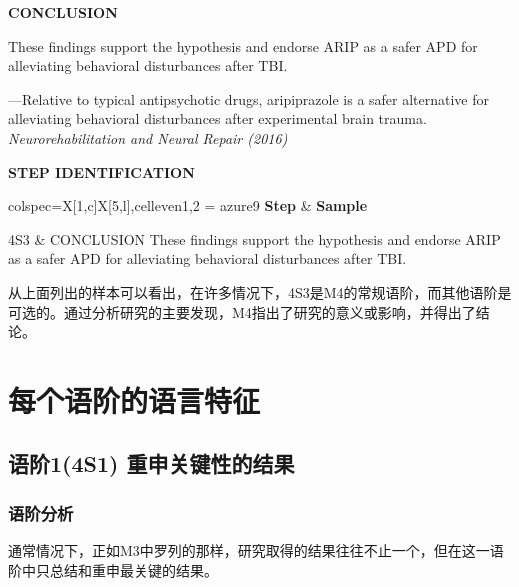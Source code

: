 \documentclass[a4paper]{ctexbook}
\begin{document}
\begin{sample}[label={myautocounter}]{\heiti}
  
  \textbf{CONCLUSION}
  
  These findings support the hypothesis and endorse ARIP as a safer APD for alleviating behavioral disturbances after TBI.


  \begin{flushright}
    ---Relative to typical antipsychotic drugs, aripiprazole is a safer alternative for alleviating behavioral disturbances after experimental brain trauma. \emph{Neurorehabilitation and Neural Repair (2016)}
  \end{flushright}

  \tcblower

  \noindent \textbf{STEP IDENTIFICATION}

  \vspace*{10pt}
  {\small\noindent
  \begin{tblr}{colspec={X[1,c]X[5,l]},cell{even}{1,2} = {azure9}}
    \toprule
    \textbf{Step} & \textbf{Sample} \\ 
    \midrule
  
    4S3 & CONCLUSION These findings support the hypothesis and endorse ARIP as a safer APD for alleviating behavioral disturbances after TBI.\\

    \bottomrule
  \end{tblr}
  }
  
\end{sample}

从上面列出的样本可以看出，在许多情况下，4S3是M4的常规语阶，而其他语阶是可选的。通过分析研究的主要发现，M4指出了研究的意义或影响，并得出了结论。

\section{每个语阶的语言特征}
  \subsection{语阶1(4S1) 重申关键性的结果}
    \subsubsection{语阶分析}

    通常情况下，正如M3中罗列的那样，研究取得的结果往往不止一个，但在这一语阶中只总结和重申最关键的结果。
\end{document}
